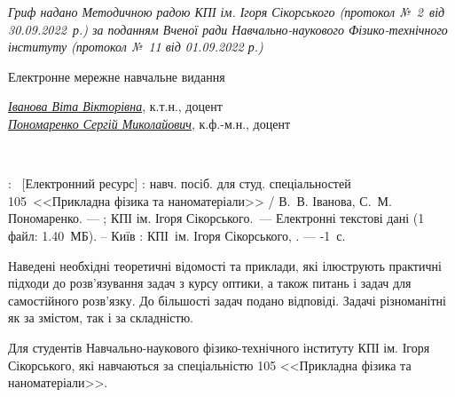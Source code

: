 {\begin{alwayssingle}
		\begin{center}\itshape\small
				Гриф надано Методичною радою КПІ ім. Ігоря Сікорського (протокол №~2~від 30.09.2022~р.) за поданням Вченої ради Навчально-наукового Фізико-технічного інституту (протокол №~11 від 01.09.2022 р.)
		\end{center}
		\begin{center}
			\ifelectronic Електронне мережне навчальне видання \fi
		\end{center}
		\begin{center}
			\href{https://apd.ipt.kpi.ua/blog/author/11}{\itshape Іванова Віта Вікторівна}, к.т.н., доцент \\
			\href{https://apd.ipt.kpi.ua/blog/author/183}{\itshape Пономаренко Сергій Миколайович}, к.ф.-м.н., доцент
		\end{center}
		\begin{center}\bfseries
			\LARGE\sffamily\realtitle \\
			\Large\sffamily\subtitletypeset
		\end{center}
        \begin{center}
            \editiontypeset
        \end{center}
        \noindent%
        \begin{minipage}[t]{\textwidth}\small
                \realtitle: \subtitletypeset\ [Електронний ресурс] : навч. посіб. для студ. спеціальностей
                105 <<Прикладна фізика та наноматеріали>> /  В.~В. Іванова, С.~М. Пономаренко. --- \editiontypeset ; КПІ ім. Ігоря Сікорського.~--- Електронні текстові дані
            (1 файл: 1.40~МБ). – Київ : КПІ ім. Ігоря Сікорського, \the\year. --- \the\numexpr{}-1\relax~с.
        \end{minipage}


		\vfill


        Наведені необхідні теоретичні відомості та приклади, які ілюструють практичні підходи до розв'язування задач з курсу оптики, а також  питань і задач для самостійного розв’язку.  До більшості задач подано відповіді. Задачі різноманітні як за змістом, так і за складністю.

        Для студентів Навчально-наукового фізико-технічного інституту КПІ ім. Ігоря Сікорського, які навчаються за спеціальністю 105 <<Прикладна фізика та наноматеріали>>.


\end{alwayssingle}}
